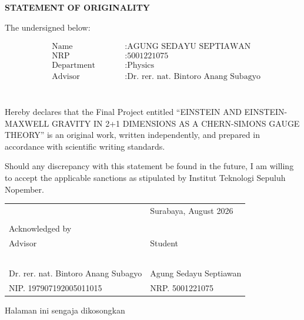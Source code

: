 \begin{center}
    \large
    \textbf{STATEMENT OF ORIGINALITY}
\end{center}

\vspace{2ex}

\noindent The undersigned below:

\begin{minipage}{\textwidth}
    \begin{align*}
        &\text{Name} \qquad &&: \text{AGUNG SEDAYU SEPTIAWAN} \\
        &\text{NRP} \qquad &&: \text{5001221075} \\
        &\text{Department} \qquad &&: \text{Physics} \\
        &\text{Advisor} \qquad &&: \text{Dr. rer. nat. Bintoro Anang Subagyo} \\
    \end{align*}
\end{minipage} \\

Hereby declares that the Final Project entitled ``EINSTEIN AND EINSTEIN-MAXWELL GRAVITY IN 2+1 DIMENSIONS AS A CHERN-SIMONS GAUGE THEORY'' is an original work, written independently, and prepared in accordance with scientific writing standards.

Should any discrepancy with this statement be found in the future, I am willing to accept the applicable sanctions as stipulated by Institut Teknologi Sepuluh Nopember.

\vspace{8ex}

\noindent\begin{tabularx}{\textwidth}{X l}
    & Surabaya, August 2026\\
    & \\
    Acknowledged by & \\
    Advisor & Student\\
    & \\
    & \\
    & \\
    & \\
    & \\
    Dr. rer. nat. Bintoro Anang Subagyo & Agung Sedayu Septiawan \\
    NIP. 197907192005011015 & NRP. 5001221075\\
\end{tabularx}

\newpage
\thispagestyle{empty}
\vspace*{\fill}
    \begin{center}
    Halaman ini sengaja dikosongkan
    \end{center}
\vspace*{\fill}
\pagebreak